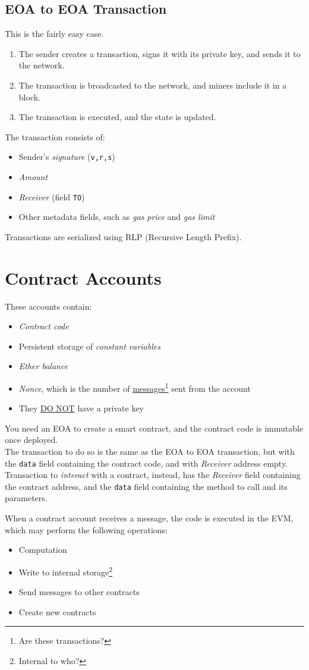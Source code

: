 \subsection{EOA to EOA Transaction}
This is the fairly easy case.
\begin{enumerate}
   \item The sender creates a transaction, signs it with its private key, and sends it to the network.
   \item The transaction is broadcasted to the network, and miners include it in a block.
   \item The transaction is executed, and the state is updated.
\end{enumerate}
The transaction consists of:
\begin{itemize}
   \item Sender's \textit{signature} (\texttt{v,r,s})
   \item \textit{Amount}
   \item \textit{Receiver} (field \texttt{TO})
   \item Other metadata fields, such as \textit{gas price} and \textit{gas limit}
\end{itemize}
Transactions are serialized using RLP (Recursive Length Prefix).

\section{Contract Accounts}
These accounts contain:
\begin{itemize}
   \item \textit{Contract code}
   \item Persistent storage of \textit{constant variables}
   \item \textit{Ether balance}
   \item \textit{Nonce}, which is the number of \ul{messages}\footnote{Are these transactions?} sent from the account
   \item They \ul{DO NOT} have a private key
\end{itemize}

You need an EOA to create a smart contract, and the contract code is immutable once deployed.\\
The transaction to do so is the same as the EOA to EOA transaction, but with the \texttt{data} field containing the contract code, and with \textit{Receiver} address empty.\\
Transaction to \textit{interact} with a contract, instead, has the \textit{Receiver} field containing the contract address, and the \texttt{data} field containing the method to call and its parameters.

When a contract account receives a message, the code is executed in the EVM, which may perform the following operations:
\begin{itemize}
   \item Computation
   \item Write to internal storage\footnote{Internal to who?}
   \item Send messages to other contracts
   \item Create new contracts
\end{itemize}

